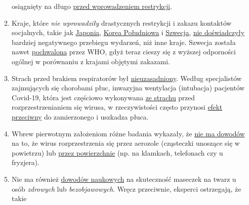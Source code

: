 \begin{enumerate}
  osiągnięty na długo
  \href{https://www.dailymail.co.uk/news/article-8235979/UKs-coronavirus-crisis-peaked-lockdown-Expert-argues-draconian-measures-unnecessary.html}{przed
  wprowadzeniem restrykcji}.
\item
  Kraje, które \emph{nie wprowadziły} drastycznych restrykcji i zakazu
  kontaktów socjalnych, takie jak
  \href{https://www.japantimes.co.jp/news/2020/03/20/national/coronavirus-explosion-expected-japan/}{Japonia},
  \href{https://www.businessinsider.com/south-korea-coronavirus-testing-death-rate-2020-3?op=1}{Korea
  Południowa} i
  \href{https://www.youtube.com/watch?v=bfN2JWifLCY}{Szwecja},
  \href{https://www.washingtontimes.com/news/2020/apr/15/sweden-coronavirus-rates-easing-despite-loose-rule/}{nie
  doświadczyły} bardziej negatywnego przebiegu wydarzeń, niż inne kraje.
  Szwecja została nawet
  \href{https://nypost.com/2020/04/29/who-lauds-sweden-as-model-for-resisting-coronavirus-lockdown/}{pochwalona}
  przez WHO, gdyż teraz cieszy się z wyższej odporności ogólnej w
  porównaniu z krajami objętymi zakazami.
\item
  Strach przed brakiem respiratorów był
  \href{https://apnews.com/8ccd325c2be9bf454c2128dcb7bd616d}{nieuzasadniony}.
  Według specjalistów zajmujących się chorobami płuc, inwazyjna
  wentylacja (intubacja) pacjentów Covid-19, która jest częściowo
  wykonywana
  \href{https://www.dailymail.co.uk/news/article-8262351/Nurse-New-York-claims-city-killing-COVID-19-patients-putting-ventilators.html}{ze
  strachu} przed rozprzestrzenianiem się wirusa, w rzeczywistości często
  przynosi \href{https://www.medscape.com/viewarticle/928156}{efekt
  przeciwny} do zamierzonego i uszkadza płuca.
\item
  Wbrew pierwotnym założeniom różne badania wykazały, że
  \href{https://www.who.int/news-room/commentaries/detail/modes-of-transmission-of-virus-causing-covid-19-implications-for-ipc-precaution-recommendations}{nie
  ma dowodów} na to, że wirus rozprzestrzenia się przez aerozole
  (cząsteczki unoszące się w powietrzu) lub
  \href{https://www.telegraph.co.uk/news/2020/04/02/no-proof-coronavirus-can-spread-shopping-says-leading-german/}{przez
  powierzchnie} (np. na klamkach, telefonach czy u fryzjera).
\item
  Nie ma również
  \href{https://www.researchgate.net/publication/340570735_Masks_Don't_Work_A_review_of_science_relevant_to_COVID-19_social_policy}{dowodów
  naukowych} na skuteczność maseczek na twarz u osób \emph{zdrowych} lub
  \emph{bezobjawowych}. Wręcz przeciwnie, eksperci ostrzegają, że takie

\end{enumerate}
